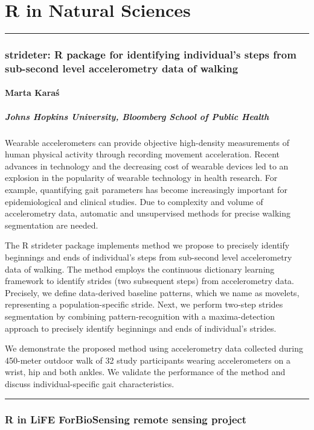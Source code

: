 \documentclass [12pt]{article}
\begin{document}
\part{R in Natural Sciences}

\noindent\rule{\textwidth}{1pt}
\section{strideter: R package for identifying individual's steps from sub-second level accelerometry data of walking}
\subsection*{Marta	Karaś}
\subsubsection*{Johns Hopkins University, Bloomberg School of Public Health}

Wearable accelerometers can provide objective high-density measurements of human physical activity through recording movement acceleration. Recent advances in technology and the decreasing cost of wearable devices led to an explosion in the popularity of wearable technology in health research. For example, quantifying gait parameters has become increasingly important for epidemiological and clinical studies. Due to complexity and volume of accelerometry data, automatic and unsupervised methods for precise walking segmentation are needed.

The R strideter package implements method we propose to precisely identify beginnings and ends of individual's steps from sub-second level accelerometry data of walking. The method employs the continuous dictionary learning framework to identify strides (two subsequent steps) from accelerometry data. Precisely, we define data-derived baseline patterns, which we name as movelets, representing a population-specific stride. Next, we perform two-step strides segmentation by combining pattern-recognition with a maxima-detection approach to precisely identify beginnings and ends of individual's strides.

We demonstrate the proposed method using accelerometry data collected during 450-meter outdoor walk of 32 study participants wearing accelerometers on a wrist, hip and both ankles. We validate the performance of the method and discuss individual-specific gait characteristics. 

\noindent\rule{\textwidth}{1pt}
\section{R in LiFE ForBioSensing remote sensing project}
\end{document}

